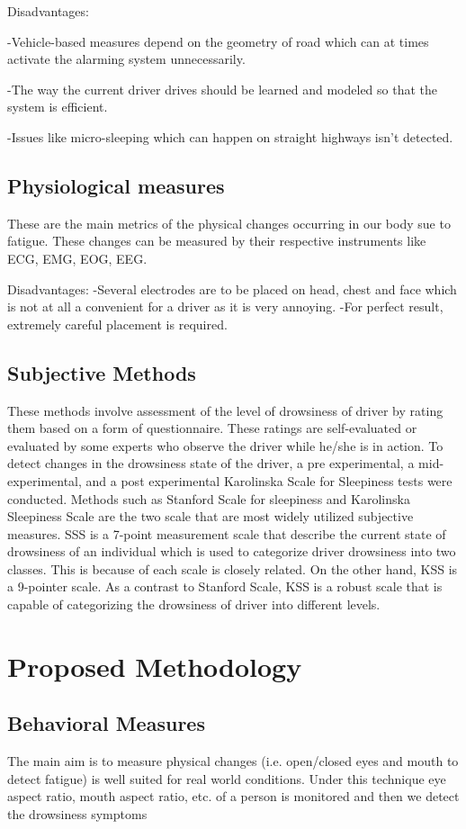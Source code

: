 \documentclass{article}
\begin{document}
\bigskip
Disadvantages: 


-Vehicle-based measures depend on the geometry of road which can at times activate the alarming system unnecessarily.


-The way the current driver drives should be learned and modeled so that the system is efficient.


-Issues like micro-sleeping which can happen on straight highways isn’t detected.  

\subsection{Physiological measures}
These are the main metrics of the physical changes occurring in our body sue to fatigue. These changes can be measured by their respective instruments like ECG, EMG, EOG, EEG.

\bigskip
Disadvantages: 
-Several electrodes are to be placed on head, chest and face which is not at all a convenient for a driver as it is very annoying. 
-For perfect result, extremely careful placement is required.
   

\subsection{Subjective Methods}
These methods involve assessment of the level of drowsiness of driver by rating them based on a form of questionnaire. These ratings are self-evaluated or evaluated by some experts who observe the driver while he/she is in action. To detect changes in the drowsiness state of the driver, a pre experimental, a mid-experimental, and a post experimental Karolinska Scale for Sleepiness tests were conducted. Methods such as Stanford Scale for sleepiness and Karolinska Sleepiness Scale are the two scale that are most widely utilized subjective measures. SSS is a 7-point measurement scale that describe the current state of drowsiness of an individual which is used to categorize driver drowsiness into two classes. This is because of each scale is closely related. On the other hand, KSS is a 9-pointer scale. As a contrast to Stanford Scale, KSS is a robust scale that is capable of categorizing the drowsiness of driver into different levels.

 
\newpage

\section{Proposed Methodology}
\subsection{Behavioral Measures}
The main aim is to measure physical changes (i.e. open/closed eyes and mouth to detect fatigue) is well suited for real world conditions. Under this technique eye aspect ratio, mouth aspect ratio, etc. of a person is monitored and then we detect the drowsiness symptoms
\end{document}
